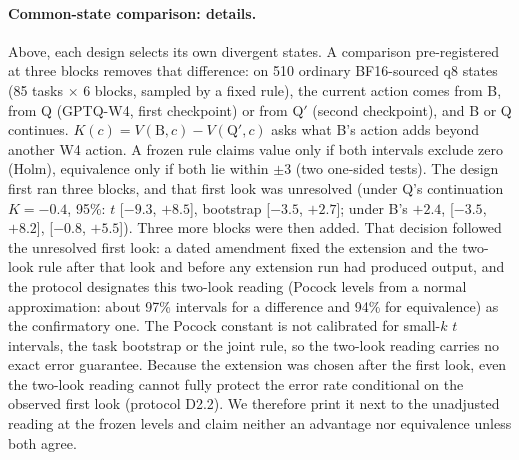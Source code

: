 \paragraph{Common-state comparison: details.} Above, each design selects its own divergent states. A comparison pre-registered at three blocks removes that difference: on 510 ordinary BF16-sourced q8 states (85 tasks $\times$ 6 blocks, sampled by a fixed rule), the current action comes from B, from Q (GPTQ-W4, first checkpoint) or from Q$'$ (second checkpoint), and B or Q continues. $K(c)=V(\mathrm{B},c)-V(\mathrm{Q}',c)$ asks what B's action adds beyond another W4 action. A frozen rule claims value only if both intervals exclude zero (Holm), equivalence only if both lie within $\pm$3\pp{} (two one-sided tests). %
The design first ran three blocks, and that first look was unresolved (under Q's continuation $K=-0.4$\pp{}, 95\%: $t$ [$-9.3$, $+8.5$], bootstrap [$-3.5$, $+2.7$]; under B's $+2.4$\pp{}, [$-3.5$, $+8.2$], [$-0.8$, $+5.5$]). Three more blocks were then added. That decision followed the unresolved first look: a dated amendment fixed the extension and the two-look rule after that look and before any extension run had produced output, and the protocol designates this two-look reading (Pocock levels from a normal approximation: about 97\% intervals for a difference and 94\% for equivalence) as the confirmatory one. The Pocock constant is not calibrated for small-$k$ $t$ intervals, the task bootstrap or the joint rule, so the two-look reading carries no exact error guarantee. Because the extension was chosen after the first look, even the two-look reading cannot fully protect the error rate conditional on the observed first look (protocol D2.2). We therefore print it next to the unadjusted reading at the frozen levels and claim neither an advantage nor equivalence unless both agree. %

